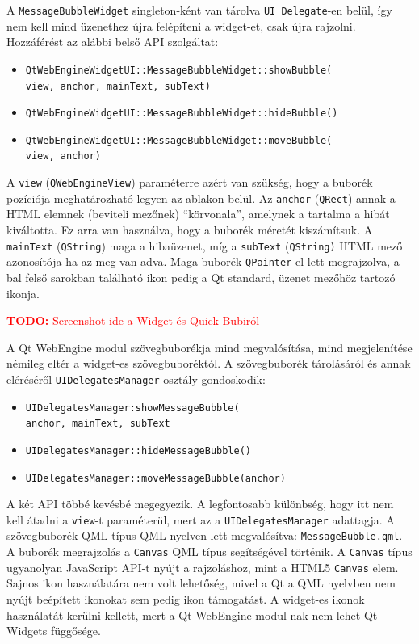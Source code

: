 \documentclass[12pt]{report}
\newcommand{\todo}[1]{%
    \textcolor{red}{\textbf{TODO:} #1}
}
\begin{document}
A \texttt{MessageBubbleWidget} singleton-ként van tárolva \texttt{UI Delegate}-en belül,
így nem kell mind üzenethez újra felépíteni a widget-et, csak újra rajzolni. Hozzáférést
az alábbi belső API szolgáltat:
\begin{itemize}
    \item \texttt{QtWebEngineWidgetUI::MessageBubbleWidget::showBubble(} \\
                    \texttt{view, anchor, mainText, subText)}
    \item \texttt{QtWebEngineWidgetUI::MessageBubbleWidget::hideBubble()}
    \item \texttt{QtWebEngineWidgetUI::MessageBubbleWidget::moveBubble(} \\
                    \texttt{view, anchor)}
\end{itemize}
A \texttt{view} (\texttt{QWebEngineView}) paraméterre azért van szükség, hogy a buborék
pozíciója meghatározható legyen az ablakon belül. Az \texttt{anchor} (\texttt{QRect}) annak
a HTML elemnek (beviteli mezőnek) ``körvonala'', amelynek a tartalma a hibát kiváltotta.
Ez arra van használva, hogy a buborék méretét kiszámítsuk. A \texttt{mainText}
(\texttt{QString}) maga a hibaüzenet, míg a \texttt{subText} (\texttt{QString)} HTML mező
azonosítója ha az meg van adva. Maga buborék \texttt{QPainter}-el lett megrajzolva, a bal
felső sarokban található ikon pedig a Qt standard, üzenet mezőhöz tartozó ikonja.

\todo{Screenshot ide a Widget és Quick Bubiról}

A Qt WebEngine modul szövegbuborékja mind megvalósítása, mind megjelenítése némileg eltér
a widget-es szövegbuboréktól. A szövegbuborék tárolásáról és annak eléréséről
\texttt{UIDelegatesManager} osztály gondoskodik:
\begin{itemize}
    \item \texttt{UIDelegatesManager:showMessageBubble(} \\
                    \texttt{anchor, mainText, subText}
    \item \texttt{UIDelegatesManager::hideMessageBubble()}
    \item \texttt{UIDelegatesManager::moveMessageBubble(anchor)}
\end{itemize}
A két API többé kevésbé megegyezik. A legfontosabb különbség, hogy itt nem kell átadni a
\texttt{view}-t paraméterül, mert az a \texttt{UIDelegatesManager} adattagja. A szövegbuborék
QML típus QML nyelven lett megvalósítva: \texttt{MessageBubble.qml}. A buborék
megrajzolás a \texttt{Canvas} QML típus segítségével történik. A \texttt{Canvas} típus
ugyanolyan JavaScript API-t nyújt a rajzoláshoz, mint a HTML5 \texttt{Canvas} elem.
Sajnos ikon használatára nem volt lehetőség, mivel a Qt a QML nyelvben nem nyújt beépített
ikonokat sem pedig ikon támogatást. A widget-es ikonok használatát kerülni kellett, mert
a Qt WebEngine modul-nak nem lehet Qt Widgets függősége.
\end{document}
